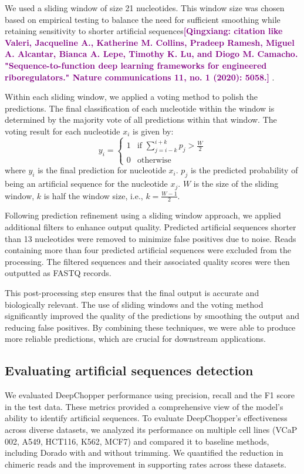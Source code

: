 \documentclass[pdflatex,sn-nature, lineno]{sn-jnl}%
\newcommand{\qx}[1]{\textcolor{purple}{\textbf{[Qingxiang: #1]}}}
\theoremstyle{thmstyleone}%
\theoremstyle{thmstyletwo}%
\theoremstyle{thmstylethree}%
\begin{document}
We used a sliding window of size 21 nucleotides.
This window size was chosen based on empirical testing to balance the need for sufficient smoothing while retaining sensitivity to shorter artificial sequences\qx{citation like Valeri, Jacqueline A., Katherine M. Collins, Pradeep Ramesh, Miguel A. Alcantar, Bianca A. Lepe, Timothy K. Lu, and Diogo M. Camacho. "Sequence-to-function deep learning frameworks for engineered riboregulators." Nature communications 11, no. 1 (2020): 5058.} .

Within each sliding window, we applied a voting method to polish the predictions.
The final classification of each nucleotide within the window is determined by the majority vote of all predictions within that window.
The voting result for each nucleotide \( x_i \) is given by:
\[
	y_i = \begin{cases}
		1 & \text{if } \sum_{j=i-k}^{i+k} p_j > \frac{W}{2} \\
		0 & \text{otherwise}
	\end{cases}
\]
where \( y_i \) is the final prediction for nucleotide \( x_i \). \( p_j \) is the predicted probability of being an artificial sequence for the nucleotide \( x_j \). \( W \) is the size of the sliding window, \( k \) is half the window size, i.e., \( k = \frac{W-1}{2} \).

Following prediction refinement using a sliding window approach, we applied additional filters to enhance output quality.
Predicted artificial sequences shorter than 13 nucleotides were removed to minimize false positives due to noise.
Reads containing more than four predicted artificial sequences were excluded from the processing.
The filtered sequences and their associated quality scores were then outputted as FASTQ records.

This post-processing step ensures that the final output is accurate and biologically relevant.
The use of sliding windows and the voting method significantly improved the quality of the predictions by smoothing the output and reducing false positives.
By combining these techniques, we were able to produce more reliable predictions, which are crucial for downstream applications.


\subsection{Evaluating artificial sequences detection}

We evaluated DeepChopper performance using precision, recall and the F1 score in the test data.
These metrics provided a comprehensive view of the model's ability to identify artificial sequences.
To evaluate DeepChopper's effectiveness across diverse datasets, we analyzed its performance on multiple cell lines (VCaP 002, A549, HCT116, K562, MCF7) and compared it to baseline methods, including Dorado with and without trimming.
We quantified the reduction in chimeric reads and the improvement in supporting rates across these datasets.
\end{document}

